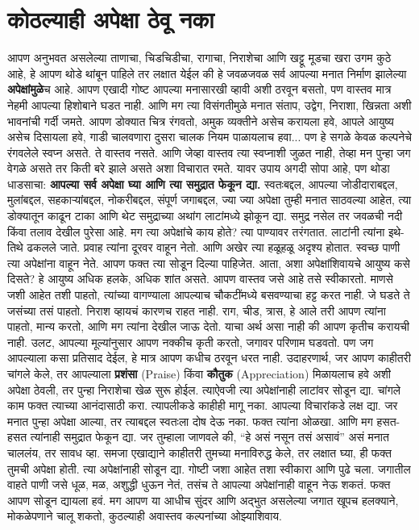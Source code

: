  \chapter{कोठल्याही अपेक्षा ठेवू नका}
आपण अनुभवत असलेल्या ताणाचा, चिडचिडीचा, रागाचा, निराशेचा आणि खट्टू मूडचा खरा उगम कुठे आहे, हे आपण थोडे थांबून पाहिले तर लक्षात येईल की हे जवळजवळ सर्व आपल्या मनात निर्माण झालेल्या \textbf{अपेक्षांमुळे}च आहे. आपण एखादी गोष्ट आपल्या मनासारखी व्हावी अशी ठरवून बसतो, पण वास्तव मात्र नेहमी आपल्या हिशोबाने घडत नाही. आणि मग त्या विसंगतीमुळे मनात संताप, उद्वेग, निराशा, खिन्नता अशी भावनांची गर्दी जमते.
आपण डोक्यात चित्र रंगवतो,  अमुक व्यक्तीने असेच करायला हवे, आपले आयुष्य असेच दिसायला हवे, गाडी चालवणारा दुसरा चालक नियम पाळायलाच हवा... पण हे सगळे केवळ कल्पनेचे रंगवलेले स्वप्न असते. ते वास्तव नसते. आणि जेव्हा वास्तव त्या स्वप्नाशी जुळत नाही, तेव्हा मन पुन्हा जग वेगळे असते तर किती बरे झाले असते अशा विचारात रमते.
यावर उपाय अगदी सोपा आहे, पण थोडा धाडसाचा:
 \textbf{आपल्या सर्व अपेक्षा घ्या आणि त्या समुद्रात फेकून द्या.}
स्वतःबद्दल, आपल्या जोडीदाराबद्दल, मुलांबद्दल, सहकाऱ्यांबद्दल, नोकरीबद्दल, संपूर्ण जगाबद्दल, ज्या ज्या अपेक्षा तुम्ही मनात साठवल्या आहेत, त्या डोक्यातून काढून टाका आणि थेट समुद्राच्या अथांग लाटांमध्ये झोकून द्या. समुद्र नसेल तर जवळची नदी किंवा तलाव देखील पुरेसा आहे.
मग त्या अपेक्षांचे काय होते? त्या पाण्यावर तरंगतात. लाटांनी त्यांना इथे-तिथे ढकलले जाते. प्रवाह त्यांना दूरवर वाहून नेतो. आणि अखेर त्या हळूहळू अदृश्य होतात. स्वच्छ पाणी त्या अपेक्षांना वाहून नेते. आपण फक्त त्या सोडून दिल्या पाहिजेत.
आता, अशा अपेक्षांशिवायचे आयुष्य कसे दिसते? हे आयुष्य अधिक हलके, अधिक शांत असते. आपण वास्तव जसे आहे तसे स्वीकारतो. माणसे जशी आहेत तशी पाहतो, त्यांच्या वागण्याला आपल्याच चौकटींमध्ये बसवण्याचा हट्ट करत नाही. जे घडते ते जसंच्या तसं पाहतो. निराश व्हायचं कारणच राहत नाही. राग, चीड, त्रास, हे आले तरी आपण त्यांना पाहतो, मान्य करतो, आणि मग त्यांना देखील जाऊ देतो.
याचा अर्थ असा नाही की आपण कृतीच करायची नाही. उलट, आपल्या मूल्यांनुसार आपण नक्कीच कृती करतो, जगावर परिणाम घडवतो. पण जग आपल्याला कसा प्रतिसाद देईल, हे मात्र आपण कधीच ठरवून धरत नाही.
उदाहरणार्थ, जर आपण काहीतरी चांगले केले, तर आपल्याला \textbf{प्रशंसा} (Praise) किंवा \textbf{कौतुक} (Appreciation) मिळायलाच हवे अशी अपेक्षा ठेवली, तर पुन्हा निराशेचा खेळ सुरू होईल. त्याऐवजी त्या अपेक्षांनाही लाटांवर सोडून द्या. चांगले काम फक्त त्याच्या आनंदासाठी करा. त्यापलीकडे काहीही मागू नका.
आपल्या विचारांकडे लक्ष द्या. जर मनात पुन्हा अपेक्षा आल्या, तर त्याबद्दल स्वतःला दोष देऊ नका. फक्त त्यांना ओळखा. आणि मग हसत-हसत त्यांनाही समुद्रात फेकून द्या.
जर तुम्हाला जाणवले की, “हे असं नसून तसं असावं” असं मनात चाललंय, तर सावध व्हा. समजा एखाद्याने काहीतरी तुमच्या मनाविरुद्ध केले, तर लक्षात घ्या, ही फक्त तुमची अपेक्षा होती. त्या अपेक्षांनाही सोडून द्या. गोष्टी जशा आहेत तशा स्वीकारा आणि पुढे चला.
जगातील वाहते पाणी जसे धूळ, मळ, अशुद्धी धुऊन नेतं, तसंच ते आपल्या अपेक्षांनाही वाहून नेऊ शकतं. फक्त आपण सोडून द्यायला हवं. मग आपण या आधीच सुंदर आणि अद्भुत असलेल्या जगात खूपच हलक्याने, मोकळेपणाने चालू शकतो,  कुठल्याही अवास्तव कल्पनांच्या ओझ्याशिवाय.


